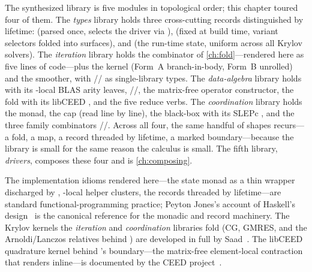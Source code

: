 \summarysection
The synthesized library is five modules in topological order; this chapter toured
four of them. The \emph{types} library holds three cross-cutting records
distinguished by lifetime:  (parsed once, selects the driver via
),  (fixed at build time, variant selectors
folded into surfaces), and  (the run-time state, uniform across all
Krylov solvers). The \emph{iteration} library holds the 
combinator of \cref{ch:fold}---rendered here as five lines of code---plus the
 kernel (Form~A branch-in-body, Form~B unrolled) and the
 smoother, with // as
single-library types. The \emph{data-algebra} library holds
 with its -local BLAS arity leaves,
//, the matrix-free operator constructor,
the  fold with its libCEED , and the five reduce
verbs. The \emph{coordination} library holds the  monad, the
 cap (read line by line), the  black-box with its
SLEPc , and the three family combinators
//. Across all four,
the same handful of shapes recurs---a fold, a map, a record threaded by lifetime, a
marked  boundary---because the library is small for the same reason
the calculus is small. The fifth library, \emph{drivers}, composes these four and
is \cref{ch:composing}.

\furtherreading
The implementation idioms rendered here---the state monad as a thin wrapper
discharged by , -local helper clusters, the records
threaded by lifetime---are standard functional-programming practice; Peyton Jones's
account of Haskell's design~\citep{peytonjones2003} is the canonical reference for
the monadic and record machinery. The Krylov kernels the \emph{iteration} and
\emph{coordination} libraries fold (CG, GMRES, and the Arnoldi/Lanczos relatives
behind ) are developed in full by Saad~\citep{saad2003}. The libCEED
quadrature kernel behind 's  boundary---the
matrix-free element-local contraction that  renders
inline---is documented by the CEED project~\citep{ceed2021}.

